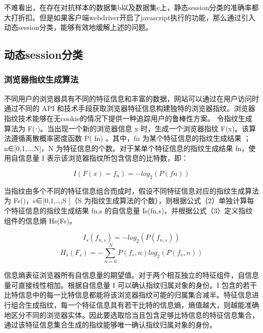 \documentclass[doctor,privacy,twoside]{buaa_mac}
\begin{document}
不难看出，在存在对抗样本的数据集b以及数据集c上，静态session分类的准确率都大打折扣。但是如果客户端webdriver开启了javascript执行的功能，那么通过引入动态session分类，能够有效地缓解上述的问题。



\subsection{动态session分类}

\subsubsection{浏览器指纹生成算法}

不同用户的浏览器具有不同的特征信息和丰富的数据，网站可以通过在用户访问时通过不同的 API 和技术手段获取浏览器特征信息构建独特的浏览器指纹。浏览器指纹技术能够在无cookie的情况下提供一种追踪用户的鲁棒性方案。
令指纹生成算法为 F(⋅)。当出现一个新的浏览器信息 x 时，生成一个浏览器指纹 F(x)。该算法遵循离散概率密度函数 P( fn) 。其中，fn 为某个特征信息的指纹生成结果 ；n∈[0,1,…,N]，N 为特征信息的个数。对于某单个特征信息的指纹生成结果 fn，使用自信息量 I 表示该浏览器指纹所包含信息的比特数，即：

\begin{equation}
I(F(x)=f_n)=-log_2(P(fn)) \tag{1}
\end{equation}

当指纹由多个不同的特征信息组合而成时，假设不同特征信息对应的指纹生成算法为 Fs()，s∈[0,1,…,S ]（S 为指纹生成算法的个数），则根据公式（2）单独计算每个特征信息的指纹生成结果 fn,s 的自信息量 Is(fn,s)，并根据公式（3）定义指纹组件的信息熵 Hs(Fs)。

\begin{equation}
I_s(f_{n,s})=-log_2(P(f_{n,s})) \tag{2} 
\end{equation}
\begin{equation}
H_s(F_s)=-\sum_{n=0}^{N}P(f_s,n)log_2(P(f_s,n)) \tag{3}
\end{equation}


信息熵表征浏览器所有自信息量的期望值。对于两个相互独立的特征组件，自信息量可直接线性相加。根据自信息量 I 可以确认指纹归属对象的身份。I 包含的若干比特信息中的每一比特信息都能将该浏览器指纹可能的归属集合减半。特征信息进行组合生成指纹，每一个特征信息具有若干比特的信息熵，熵值越大，则越能准确地区分不同的浏览器实体。因此要选取恰当且包含足够比特信息的特征信息集合，通过该特征信息集合生成的指纹能够唯一确认指纹归属对象的身份。
\end{document}
